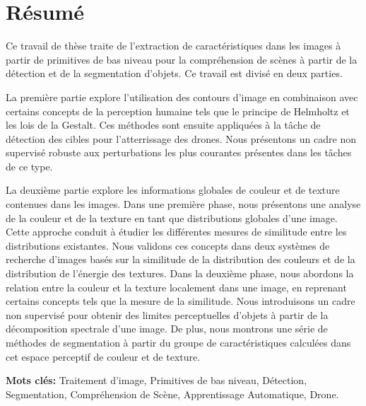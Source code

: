 \chapter*{Résumé}

\noindent Ce travail de thèse traite de l'extraction de caractéristiques dans les images à partir de primitives de bas niveau pour la compréhension de scènes à partir de la détection et de la segmentation d'objets. Ce travail est divisé en deux parties.
\newline 

\noindent La première partie explore l'utilisation des contours d'image en combinaison avec certains concepts de la perception humaine tels que le principe de Helmholtz et les lois de la Gestalt. Ces méthodes sont ensuite appliquées à la tâche de détection des cibles pour l'atterrissage des drones. Nous présentons un cadre non supervisé robuste aux perturbations les plus courantes présentes dans les tâches de ce type.
\newline 

\noindent La deuxième partie explore les informations globales de couleur et de texture contenues dans les images. Dans une première phase, nous présentons une analyse de la couleur et de la texture en tant que distributions globales d'une image. Cette approche conduit à étudier les différentes mesures de similitude entre les distributions existantes. Nous validons ces concepts dans deux systèmes de recherche d'images basés sur la similitude de la distribution des couleurs et de la distribution de l'énergie des textures. Dans la deuxième phase, nous abordons la relation entre la couleur et la texture localement dans une image, en reprenant certains concepts tels que la mesure de la similitude. Nous introduisons un cadre non supervisé pour obtenir des limites perceptuelles d'objets à partir de la décomposition spectrale d'une image. De plus, nous montrons une série de méthodes de segmentation à partir du groupe de caractéristiques calculées dans cet espace perceptif de couleur et de texture.


%
  
\vspace*{\fill}

\textbf{Mots clés:} Traitement d'image, Primitives de bas niveau, Détection, Segmentation, Compréhension de Scène, Apprentissage Automatique, Drone.
